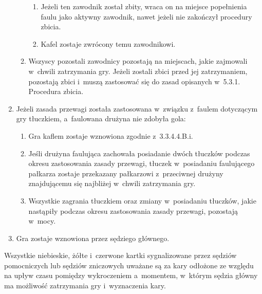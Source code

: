 \documentclass[12pt,a4paper]{article}
\renewcommand{\subsubsection}[1]{
  \oldsubsubsection{#1}%
  \leftskip1.3cm
}
\begin{document}
\begin{enumerate}
\begin{enumerate}
		            \begin{enumerate}
			            \item
			                  Jeżeli ten zawodnik został zbity, wraca on na miejsce popełnienia
			                  faulu jako aktywny zawodnik, nawet jeżeli nie zakończył
			                  procedury zbicia.
			            \item
			                  Kafel zostaje zwrócony temu zawodnikowi.
		            \end{enumerate}
		      \item
		            Wszyscy pozostali zawodnicy pozostają na miejscach, jakie zajmowali
		            w~chwili zatrzymania gry. Jeżeli zostali zbici przed jej
		            zatrzymaniem, pozostają zbici i~muszą zastosować się do zasad
		            opisanych w~5.3.1. Procedura zbicia.
	      \end{enumerate}
	\item
	      Jeżeli zasada przewagi została zastosowana w~związku z~faulem
	      dotyczącym gry tłuczkiem, a~faulowana drużyna nie zdobyła gola:

	      \begin{enumerate}
		      \item
		            Gra kaflem zostaje wznowiona zgodnie z~3.3.4.4.B.i.
		      \item
		            Jeśli drużyna faulująca zachowała posiadanie dwóch tłuczków podczas
		            okresu zastosowania zasady przewagi, tłuczek w~posiadaniu
		            faulującego pałkarza zostaje przekazany pałkarzowi z~przeciwnej
		            drużyny znajdującemu się najbliżej w~chwili zatrzymania gry.
		      \item
				Wszystkie zagrania tłuczkiem oraz zmiany w~posiadaniu tłuczków, jakie nastąpiły
				podczas okresu zastosowania zasady przewagi, pozostają w~mocy.
	      \end{enumerate}
	\item
	      Gra zostaje wznowiona przez sędziego głównego.
\end{enumerate}

\subsubsection{Odłożone kary}

Wszystkie niebieskie, żółte i~czerwone kartki sygnalizowane przez
sędziów pomocniczych lub sędziów zniczowych uważane są za kary odłożone
ze względu na upływ czasu pomiędzy wykroczeniem a~momentem, w~którym
sędzia główny ma możliwość zatrzymania gry i~wyznaczenia kary.
\end{document}
